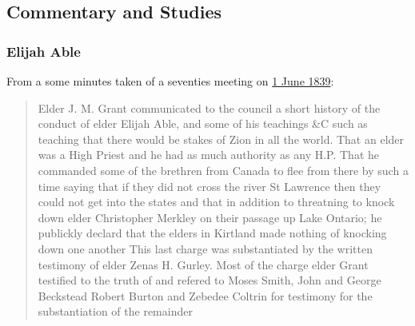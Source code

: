 	
	
	
\subsection{Commentary and Studies} %
	\label{RACE-COMMENTARY}

	
		
	\subsubsection{Elijah Able}
		\label{RACE-study}
		
			From a some minutes taken of a seventies meeting on \href{https://www.josephsmithpapers.org/paper-summary/minutes-and-discourse-1-2-june-1839/1}{1 June 1839}:
			
				\begin{quote}
					Elder J. M. Grant communicated to the council a short history of the conduct of elder Elijah Able, and some of his teachings \&C such as teaching that there would be stakes of Zion in all the world. That an elder was a High Priest and he had as much authority as any H.P. That he commanded some of the brethren from Canada to flee from there by such a time saying that if they did not cross the river St Lawrence then they could not get into the states and that in addition to threatning to knock down elder Christopher Merkley on their passage up Lake Ontario; he publickly declard that the elders in Kirtland made nothing of knocking down one another This last charge was substantiated by the written testimony of elder Zenas H. Gurley. Most of the charge elder Grant testified to the truth of and refered to Moses Smith, John and George Beckstead Robert Burton and Zebedee Coltrin for testimony for the substantiation of the remainder
				\end{quote}
				
